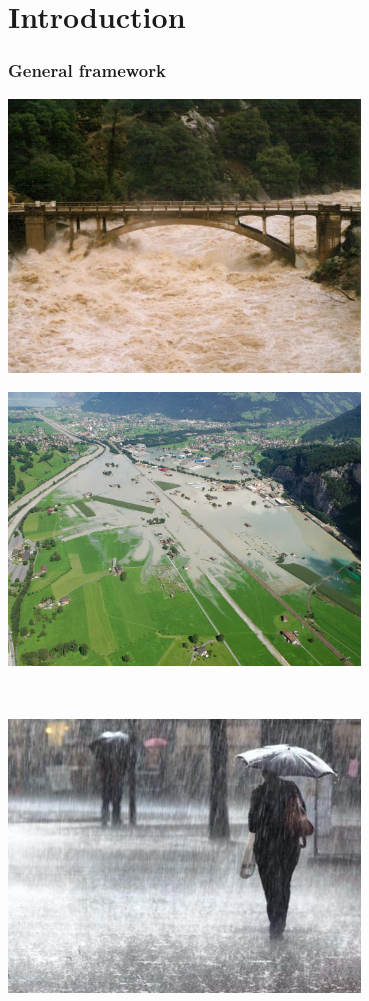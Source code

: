 \documentclass[xcolor=dvipsnames, USenglish]{beamer}  %
\begin{document}
\section{Introduction}
  \begin{frame}
    \frametitle{General framework}
    \centering
    \begin{minipage}{.48\textwidth}
      \hfill
      \includegraphics[width=0.7\textwidth]{img/flood_bridge.jpg}
      \raggedright{}
    \end{minipage}
    \begin{minipage}{.48\textwidth}
      \includegraphics[width=0.7\textwidth]{img/flooding.jpg}
      \hfill
      \raggedright{}
    \end{minipage}
    \\
    \begin{minipage}{.48\textwidth}
      \hfill
      \includegraphics[width=0.7\textwidth]{img/heavy_rainfall.jpg}

\end{minipage}
\end{frame}
\end{document}
